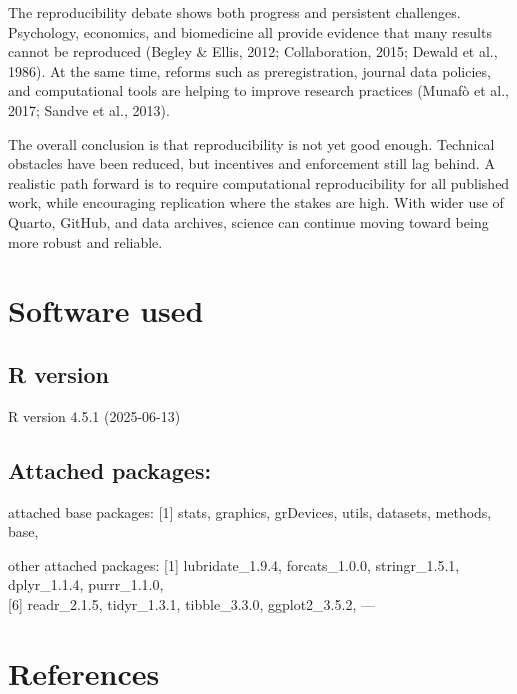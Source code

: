 \documentclass[
  a4paper,
]{article}
\begin{document}
The reproducibility debate shows both progress and persistent
challenges. Psychology, economics, and biomedicine all provide evidence
that many results cannot be reproduced (Begley \& Ellis, 2012;
Collaboration, 2015; Dewald et al., 1986). At the same time, reforms
such as preregistration, journal data policies, and computational tools
are helping to improve research practices (Munafò et al., 2017; Sandve
et al., 2013).

The overall conclusion is that reproducibility is not yet good enough.
Technical obstacles have been reduced, but incentives and enforcement
still lag behind. A realistic path forward is to require computational
reproducibility for all published work, while encouraging replication
where the stakes are high. With wider use of Quarto, GitHub, and data
archives, science can continue moving toward being more robust and
reliable.

\section{Software used}\label{software-used}

\subsection{R version}\label{r-version}

R version 4.5.1 (2025-06-13)

\subsection{Attached packages:}\label{attached-packages}

attached base packages: {[}1{]} stats, graphics, grDevices, utils,
datasets, methods, base,

other attached packages: {[}1{]} lubridate\_1.9.4, forcats\_1.0.0,
stringr\_1.5.1, dplyr\_1.1.4, purrr\_1.1.0,\\
{[}6{]} readr\_2.1.5, tidyr\_1.3.1, tibble\_3.3.0, ggplot2\_3.5.2, ---

\section*{References}\label{references}
\end{document}
